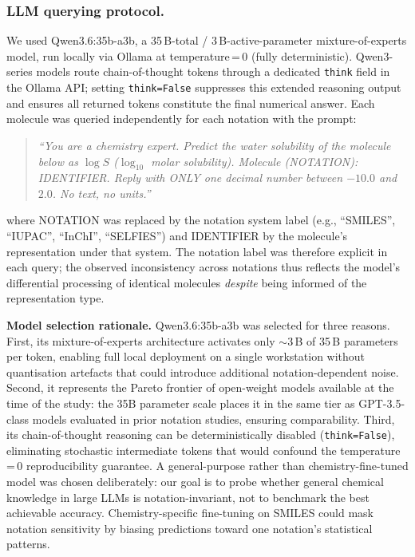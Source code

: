 \documentclass[twoside,twocolumn,9pt]{article}
\begin{document}
\subsubsection{LLM querying protocol.~~} We used Qwen3.6:35b-a3b,\cite{qwen2025} a 35\,B-total / 3\,B-active-parameter mixture-of-experts model, run locally via Ollama at temperature\,=\,0 (fully deterministic). Qwen3-series models route chain-of-thought tokens through a dedicated \texttt{think} field in the Ollama API; setting \texttt{think=False} suppresses this extended reasoning output and ensures all returned tokens constitute the final numerical answer. Each molecule was queried independently for each notation with the prompt:

\begin{quote}\small
\textit{``You are a chemistry expert. Predict the water solubility of the molecule below as $\log S$ ($\log_{10}$ molar solubility). Molecule (NOTATION): IDENTIFIER. Reply with ONLY one decimal number between $-10.0$ and $2.0$. No text, no units.''}
\end{quote}

\noindent where NOTATION was replaced by the notation system label (e.g., ``SMILES'', ``IUPAC'', ``InChI'', ``SELFIES'') and IDENTIFIER by the molecule's representation under that system. The notation label was therefore explicit in each query; the observed inconsistency across notations thus reflects the model's differential processing of identical molecules \textit{despite} being informed of the representation type.

\textbf{Model selection rationale.} Qwen3.6:35b-a3b was selected for three reasons. First, its mixture-of-experts architecture activates only $\sim$3\,B of 35\,B parameters per token, enabling full local deployment on a single workstation without quantisation artefacts that could introduce additional notation-dependent noise. Second, it represents the Pareto frontier of open-weight models available at the time of the study: the 35B parameter scale places it in the same tier as GPT-3.5-class models evaluated in prior notation studies,\cite{yan2025} ensuring comparability. Third, its chain-of-thought reasoning can be deterministically disabled (\texttt{think=False}), eliminating stochastic intermediate tokens that would confound the temperature\,=\,0 reproducibility guarantee. A general-purpose rather than chemistry-fine-tuned model was chosen deliberately: our goal is to probe whether general chemical knowledge in large LLMs is notation-invariant, not to benchmark the best achievable accuracy. Chemistry-specific fine-tuning on SMILES could mask notation sensitivity by biasing predictions toward one notation's statistical patterns.
\end{document}
